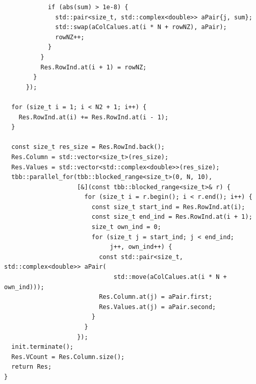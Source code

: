 \documentclass{report}
\begin{document}
\begin{lstlisting}
            if (abs(sum) > 1e-8) {
              std::pair<size_t, std::complex<double>> aPair{j, sum};
              std::swap(aColCalues.at(i * N + rowNZ), aPair);
              rowNZ++;
            }
          }
          Res.RowInd.at(i + 1) = rowNZ;
        }
      });

  for (size_t i = 1; i < N2 + 1; i++) {
    Res.RowInd.at(i) += Res.RowInd.at(i - 1);
  }

  const size_t res_size = Res.RowInd.back();
  Res.Column = std::vector<size_t>(res_size);
  Res.Values = std::vector<std::complex<double>>(res_size);
  tbb::parallel_for(tbb::blocked_range<size_t>(0, N, 10),
                    [&](const tbb::blocked_range<size_t>& r) {
                      for (size_t i = r.begin(); i < r.end(); i++) {
                        const size_t start_ind = Res.RowInd.at(i);
                        const size_t end_ind = Res.RowInd.at(i + 1);
                        size_t own_ind = 0;
                        for (size_t j = start_ind; j < end_ind;
                             j++, own_ind++) {
                          const std::pair<size_t, std::complex<double>> aPair(
                              std::move(aColCalues.at(i * N + own_ind)));
                          Res.Column.at(j) = aPair.first;
                          Res.Values.at(j) = aPair.second;
                        }
                      }
                    });
  init.terminate();
  Res.VCount = Res.Column.size();
  return Res;
}
\end{lstlisting}


\newpage
\end{document}
